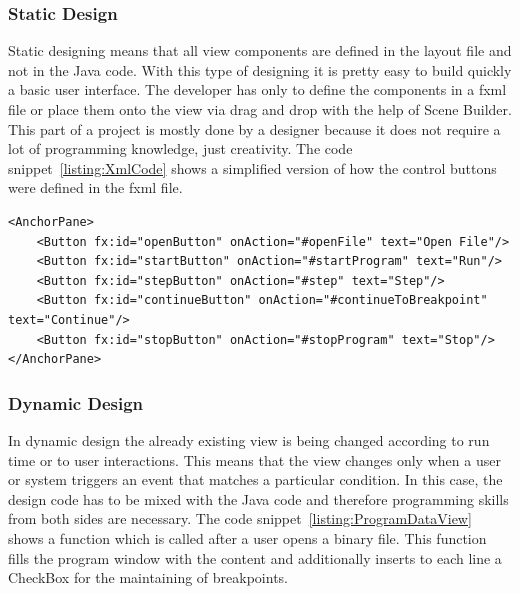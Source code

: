 \subsubsection{Static Design}
Static designing means that all view components are defined in the layout file and not in the Java code. With this type of designing it is pretty easy to build quickly a basic user interface. The developer has only to define the components in a fxml file or place them onto the view via drag and drop with the help of Scene Builder. This part of a project is mostly done by a designer because it does not require a lot of programming knowledge, just creativity. The code snippet~\ref{listing:XmlCode} shows a simplified version of how the control buttons were defined in the fxml file.
\lstset{language=XML,style=MyStyle}
\begin{lstlisting}[caption={FXML example}, label=listing:XmlCode]
<AnchorPane>
	<Button fx:id="openButton" onAction="#openFile" text="Open File"/>
	<Button fx:id="startButton" onAction="#startProgram" text="Run"/>
	<Button fx:id="stepButton" onAction="#step" text="Step"/>
	<Button fx:id="continueButton" onAction="#continueToBreakpoint" text="Continue"/>
	<Button fx:id="stopButton" onAction="#stopProgram" text="Stop"/>
</AnchorPane>
\end{lstlisting}

\subsubsection{Dynamic Design}
In dynamic design the already existing view is being changed according to run time or to user interactions. This means that the view changes only when a user or system triggers an event that matches a particular condition. In this case, the design code has to be mixed with the Java code and therefore programming skills from both sides are necessary. The code snippet~\ref{listing:ProgramDataView} shows a function which is called after a user opens a binary file. This function fills the program window with the content and additionally inserts to each line a CheckBox for the maintaining of breakpoints.

  
